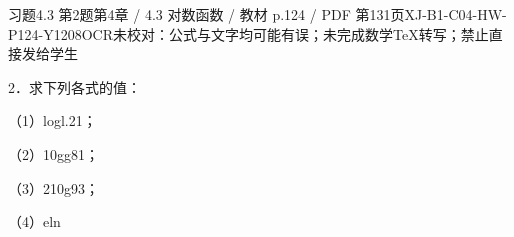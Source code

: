 \begin{bankitem}{习题4.3 第2题}{第4章 / 4.3 对数函数 / 教材 p.124 / PDF 第131页}{XJ-B1-C04-HW-P124-Y1208}{OCR未校对：公式与文字均可能有误；未完成数学TeX转写；禁止直接发给学生}
\begin{ocrdraft}
\par
2．求下列各式的值：
\par
（1）logl.21；
\par
（2）10gg81；
\par
（3）210g93；
\par
（4）eln
\end{ocrdraft}
\end{bankitem}
